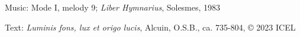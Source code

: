 \hymn





\begin{hymnsource}
Music: Mode I, melody 9; \emph{Liber Hymnarius}, Solesmes, 1983

Text: \emph{Luminis fons, lux et origo lucis}, Alcuin, O.S.B., ca. 735-804, © 2023 ICEL
\end{hymnsource}
